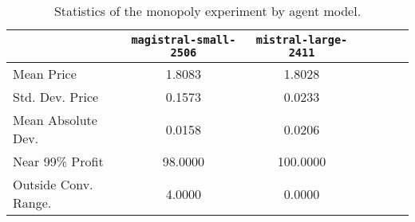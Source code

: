 \begin{table}[H]
\centering
\caption{Statistics of the monopoly experiment by agent model.}
\label{tab:monopoly_stats}
\begin{tabular}{lcccccc}
\toprule
 & \texttt{magistral-small-2506} & \texttt{mistral-large-2411} \\
\midrule
Mean Price & 1.8083 & 1.8028 \\
Std. Dev. Price & 0.1573 & 0.0233 \\
Mean Absolute Dev. & 0.0158 & 0.0206 \\
Near 99\% Profit & 98.0000 & 100.0000 \\
Outside Conv. Range. & 4.0000 & 0.0000 \\
\bottomrule
\end{tabular}

\end{table}
